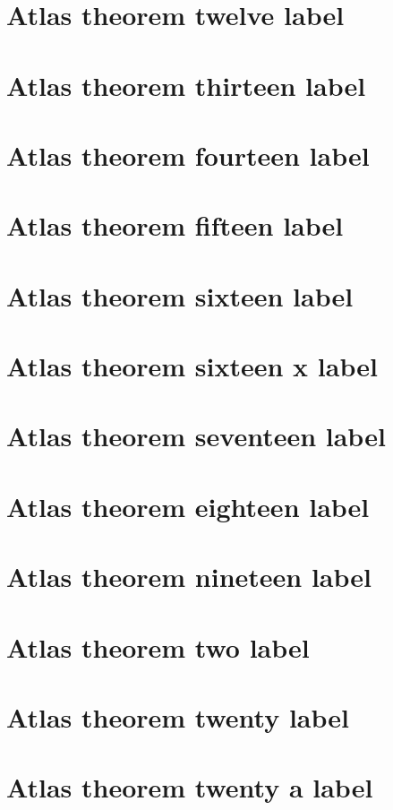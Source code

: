 \documentclass[11pt]{article}
\theoremstyle{definition}
\begin{document}
\section{Atlas theorem twelve label}
\label{ll:labels:atlas-t12}
\section{Atlas theorem thirteen label}
\label{ll:labels:atlas-t13}
\section{Atlas theorem fourteen label}
\label{ll:labels:atlas-t14}
\section{Atlas theorem fifteen label}
\label{ll:labels:atlas-t15}
\section{Atlas theorem sixteen label}
\label{ll:labels:atlas-t16}
\section{Atlas theorem sixteen x label}
\label{ll:labels:atlas-t16x}
\section{Atlas theorem seventeen label}
\label{ll:labels:atlas-t17}
\section{Atlas theorem eighteen label}
\label{ll:labels:atlas-t18}
\section{Atlas theorem nineteen label}
\label{ll:labels:atlas-t19}
\section{Atlas theorem two label}
\label{ll:labels:atlas-t2}
\section{Atlas theorem twenty label}
\label{ll:labels:atlas-t20}
\section{Atlas theorem twenty a label}
\label{ll:labels:atlas-t20a}
\end{document}
